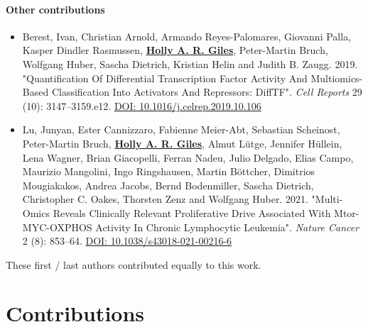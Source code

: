 \documentclass[11pt, a4paper, twosided]{book}
\begin{document}
\begin{sloppypar}
{    \subsubsection*{Other contributions}\label{other-contributions}}
    \begin{itemize}
        \item Berest, Ivan\ast, Christian Arnold\ast, Armando Reyes-Palomares, Giovanni Palla, Kasper Dindler Rasmussen, \textbf{\underline{Holly A. R. Giles}}, Peter-Martin Bruch, Wolfgang Huber, Sascha Dietrich, Kristian Helin and Judith B. Zaugg. 2019. "Quantification Of Differential Transcription Factor Activity And Multiomics-Based Classification Into Activators And Repressors: DiffTF". \textit{Cell Reports} 29 (10): 3147–3159.e12. \href{https://doi.org/10.1016/j.celrep.2019.10.106}{DOI: 10.1016/j.celrep.2019.10.106}
        
      \item Lu, Junyan\ast, Ester Cannizzaro\ast, Fabienne Meier-Abt, Sebastian Scheinost, Peter-Martin Bruch, \textbf{\underline{Holly A. R. Giles}}, Almut Lütge, Jennifer Hüllein, Lena Wagner, Brian Giacopelli, Ferran Nadeu, Julio Delgado, Elias Campo, Maurizio Mangolini, Ingo Ringshausen, Martin Böttcher, Dimitrios Mougiakakos, Andrea Jacobs, Bernd Bodenmiller, Sascha Dietrich, Christopher C. Oakes, Thorsten Zenz and Wolfgang Huber.  2021. "Multi-Omics Reveals Clinically Relevant Proliferative Drive Associated With Mtor-MYC-OXPHOS Activity In Chronic Lymphocytic Leukemia". \textit{Nature Cancer} 2 (8): 853–64. \href{https://doi.org/10.1038/s43018-021-00216-6}{DOI: 10.1038/s43018-021-00216-6}
    \end{itemize}
    \ast These first / last authors contributed equally to this work.
\end{sloppypar}
\newpage\null\newpage

    \hypertarget{contributions}{%
    \chapter*{Contributions}\label{contributions}}
\end{document}
